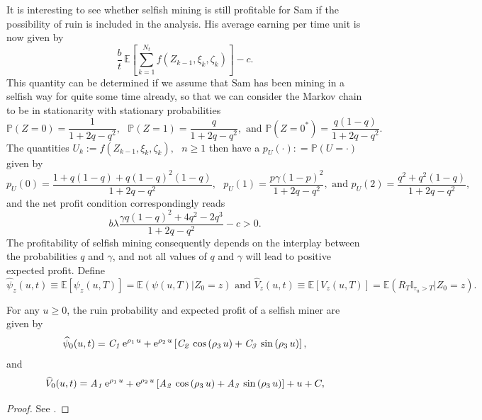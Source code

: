 \noindent It is interesting to see whether selfish mining is still profitable for Sam if the possibility of ruin is included in the analysis. His average earning per time unit is now given by 
\begin{equation}\label{eq:average_earning_selfish}
\frac{b}{t}\,\mathbb{E}\left[\sum_{k = 1}^{N_t}f(Z_{k-1},\xi_k,\zeta_k)\right] - c.
\end{equation}
This quantity can be determined if we assume that Sam has been mining in a selfish way for quite some time already, so that we can consider the Markov chain to be in stationarity with stationary probabilities
$$
\mathbb{P}(Z = 0)=\frac{1}{1+2q-q^2},\text{ }\mathbb{P}(Z = 1)=\frac{q}{1+2q-q^2},\text{ and }\mathbb{P}(Z = 0^{\ast})=\frac{q(1-q)}{1+2q-q^2}.
$$
The quantities $U_k:=f\left(Z_{k-1},\xi_k,\zeta_k\right),\text{ }n\geq1$ then have a \pmf $p_U(\cdot): =\mathbb{P}(U = \cdot)$ given by 
$$
p_U(0) =\frac{1+q(1-q)+q(1-q)^2(1-q)}{1+2q-q^2},\text{ }p_U(1)=\frac{p\gamma(1-p)^2}{1+2q-q^2},\text{ and }p_U(2)=\frac{q^2+q^2(1-q)}{1+2q-q^2},
$$
and the net profit condition correspondingly reads
\begin{equation*}
b\lambda\frac{\gamma q(1-q)^2 + 4q^2-2q^3}{1+2q-q^2} - c>0.
\end{equation*}
The profitability of selfish mining consequently depends on the interplay between the probabilities $q$ and $\gamma$, and not all values of $q$ and $\gamma$ will lead to positive expected profit. Define 
\begin{equation*}
\widehat{\psi}_z(u,t)\equiv \mathbb{E}\left[\psi_z(u,T)\right] = \mathbb{E}\left(\psi(u,T)\Big \rvert Z_0 = z\right)
\text{ and }\widehat{V}_z(u,t)\equiv \mathbb{E}[V_z(u,T)] = \mathbb{E}\left(R_T\mathbb{I}_{\tau_u>T}\Big \rvert Z_0 = z\right).
\end{equation*}
\begin{theo}\label{theo:psi_V_selfish}
For any $u\ge 0$, the ruin probability and expected profit of a selfish miner are given by
\begin{equation*}\label{ruin_selfish_app}
\widehat{\psi}_0(u,t) =
{\it C_1}\,{{\rm e}^{\rho_1\,u}}+{{\rm e}^{\rho_2\,u}} \left[ {\it C_2}\,
\cos \left( \rho_3\,u \right) +{\it C_3}\,\sin \left( \rho_3\,u \right)\right],
\end{equation*}
and 
\begin{equation*}
\widehat{V}_0(u,t)={\it A_1}\,{{\rm e}^{\rho_1\,u}}+{{\rm e}^{\rho_2\,u}} \left[ {\it A_2}\,
\cos \left( \rho_3\,u \right) +{\it A_3}\,\sin \left( \rho_3\,u \right)\right] +u+C,\label{thisone}
\end{equation*}
\end{theo}
\begin{proof}
See \citet{Hansjoerg2022}.
\end{proof}

